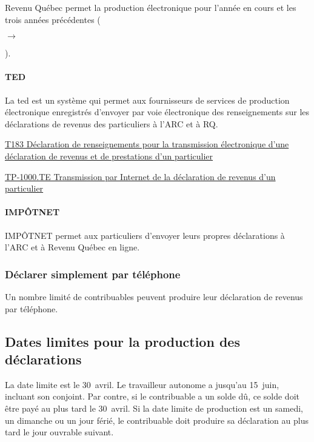 \setcounter{annee}{2023}
Revenu Québec permet la production électronique pour l'année en cours et les trois années précédentes (\addtocounter{annee}{-3}\theannee{} $\rightarrow$ \addtocounter{annee}{3}\theannee{}).

\paragraph{TED}
La \acrshort{ted} est un système qui permet aux fournisseurs de services de production électronique enregistrés d'envoyer par voie électronique des renseignements sur les déclarations de revenus des particuliers à l'ARC et à RQ.

\cat\href{https://www.canada.ca/fr/agence-revenu/services/formulaires-publications/formulaires/t183.html}{T183 Déclaration de renseignements pour la transmission électronique d'une déclaration de revenus et de prestations d'un particulier}

\qct\href{https://www.revenuquebec.ca/fr/services-en-ligne/formulaires-et-publications/details-courant/tp-1000-te/}{TP-1000.TE Transmission par Internet de la déclaration de revenus d'un particulier}

\paragraph{IMPÔTNET}
IMPÔTNET permet aux particuliers d'envoyer leurs propres déclarations à l'ARC  et à Revenu Québec en ligne.

\subsubsection{Déclarer simplement par téléphone}
Un nombre limité de contribuables peuvent produire leur déclaration de revenus par téléphone.


\subsection{Dates limites pour la production des déclarations}
La date limite est le 30~avril. Le travailleur autonome a jusqu'au 15~juin, incluant son conjoint. Par contre, si le contribuable a un solde dû, ce solde doit être payé au plus tard le 30~avril. Si la date limite de production est un samedi, un dimanche ou un jour férié, le contribuable doit produire sa déclaration au plus tard le jour ouvrable suivant.

